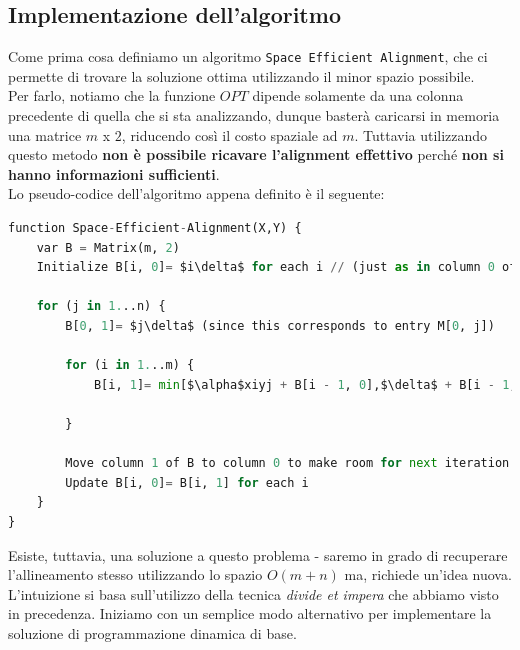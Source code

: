 \subsection{Implementazione dell'algoritmo}

Come prima cosa definiamo un algoritmo
\texttt{Space\ Efficient\ Alignment}, che ci permette di trovare la
soluzione ottima utilizzando il minor spazio possibile.\\ Per farlo,
notiamo che la funzione $OPT$ dipende solamente da una colonna
precedente di quella che si sta analizzando, dunque basterà caricarsi in
memoria una matrice $m$ x $2$, riducendo così il costo spaziale ad
$m$. Tuttavia utilizzando questo metodo \textbf{non è possibile
  ricavare l'alignment effettivo} perché \textbf{non si hanno informazioni
  sufficienti}.\\

Lo pseudo-codice dell'algoritmo appena definito è il seguente:

\begin{lstlisting}[language=Python, mathescape=true]
function Space-Efficient-Alignment(X,Y) {
    var B = Matrix(m, 2)
    Initialize B[i, 0]= $i\delta$ for each i // (just as in column 0 of M)
    
    for (j in 1...n) {
        B[0, 1]= $j\delta$ (since this corresponds to entry M[0, j])
        
        for (i in 1...m) {
            B[i, 1]= min[$\alpha$xiyj + B[i - 1, 0],$\delta$ + B[i - 1, 1], $\delta$ + B[i, 0]]

        }
        
        Move column 1 of B to column 0 to make room for next iteration:
        Update B[i, 0]= B[i, 1] for each i
    }
}
\end{lstlisting}

Esiste, tuttavia, una soluzione a questo problema - saremo in grado di
recuperare l'allineamento stesso utilizzando lo spazio $O(m + n)$ ma,
richiede un'idea nuova. L'intuizione si basa sull'utilizzo della tecnica
\emph{divide et impera} che abbiamo visto in precedenza. Iniziamo con un
semplice modo alternativo per implementare la soluzione di
programmazione dinamica di base.\\

